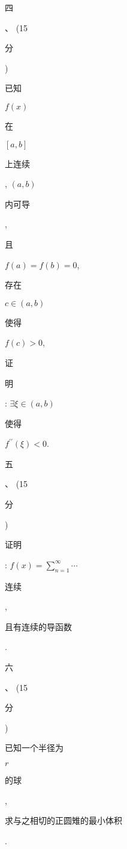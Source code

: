 \documentclass[10pt]{article}
\begin{document}
\begin{CJK}{UTF8}{mj}四\end{CJK}、 (15 \begin{CJK}{UTF8}{mj}分\end{CJK}) \begin{CJK}{UTF8}{mj}已知\end{CJK} $f(x)$ \begin{CJK}{UTF8}{mj}在\end{CJK} $[a, b]$ \begin{CJK}{UTF8}{mj}上连续\end{CJK}, $(a, b)$ \begin{CJK}{UTF8}{mj}内可导\end{CJK}, \begin{CJK}{UTF8}{mj}且\end{CJK} $f(a)=f(b)=0$, \begin{CJK}{UTF8}{mj}存在\end{CJK} $c \in(a, b)$ \begin{CJK}{UTF8}{mj}使得\end{CJK} $f(c)>0$, \begin{CJK}{UTF8}{mj}证\end{CJK} \begin{CJK}{UTF8}{mj}明\end{CJK}: $\exists \xi \in(a, b)$ \begin{CJK}{UTF8}{mj}使得\end{CJK} $f^{\prime \prime}(\xi)<0$.

\begin{CJK}{UTF8}{mj}五\end{CJK}、 (15 \begin{CJK}{UTF8}{mj}分\end{CJK}) \begin{CJK}{UTF8}{mj}证明\end{CJK}: $f(x)=\sum_{n=1}^{\infty} \cdots$ \begin{CJK}{UTF8}{mj}连续\end{CJK}, \begin{CJK}{UTF8}{mj}且有连续的导函数\end{CJK}.

\begin{CJK}{UTF8}{mj}六\end{CJK}、 (15 \begin{CJK}{UTF8}{mj}分\end{CJK}) \begin{CJK}{UTF8}{mj}已知一个半径为\end{CJK} $r$ \begin{CJK}{UTF8}{mj}的球\end{CJK}, \begin{CJK}{UTF8}{mj}求与之相切的正圆雉的最小体积\end{CJK}.
\end{document}
